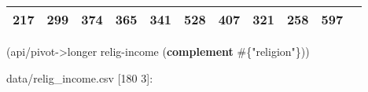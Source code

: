 \documentclass[]{article}
\newenvironment{Shaded}{\begin{snugshade}}{\end{snugshade}}
\newcommand{\KeywordTok}[1]{\textcolor[rgb]{0.13,0.29,0.53}{\textbf{#1}}}
\newcommand{\NormalTok}[1]{#1}
\newcommand{\StringTok}[1]{\textcolor[rgb]{0.31,0.60,0.02}{#1}}
\begin{document}
\begin{longtable}[]{@{}lllllllllll@{}}
\begin{minipage}[t]{0.04\columnwidth}
217\strut
\end{minipage} & \begin{minipage}[t]{0.05\columnwidth}\raggedright
299\strut
\end{minipage} & \begin{minipage}[t]{0.05\columnwidth}\raggedright
374\strut
\end{minipage} & \begin{minipage}[t]{0.05\columnwidth}\raggedright
365\strut
\end{minipage} & \begin{minipage}[t]{0.05\columnwidth}\raggedright
341\strut
\end{minipage} & \begin{minipage}[t]{0.05\columnwidth}\raggedright
528\strut
\end{minipage} & \begin{minipage}[t]{0.06\columnwidth}\raggedright
407\strut
\end{minipage} & \begin{minipage}[t]{0.06\columnwidth}\raggedright
321\strut
\end{minipage} & \begin{minipage}[t]{0.04\columnwidth}\raggedright
258\strut
\end{minipage} & \begin{minipage}[t]{0.11\columnwidth}\raggedright
597\strut
\end{minipage}\tabularnewline
\bottomrule
\end{longtable}

\begin{Shaded}
\begin{Highlighting}[]
\NormalTok{(api/pivot->longer relig-income (}\KeywordTok{complement}\NormalTok{ #\{}\StringTok{"religion"}\NormalTok{\}))}
\end{Highlighting}
\end{Shaded}

data/relig\_income.csv {[}180 3{]}:
\end{document}
